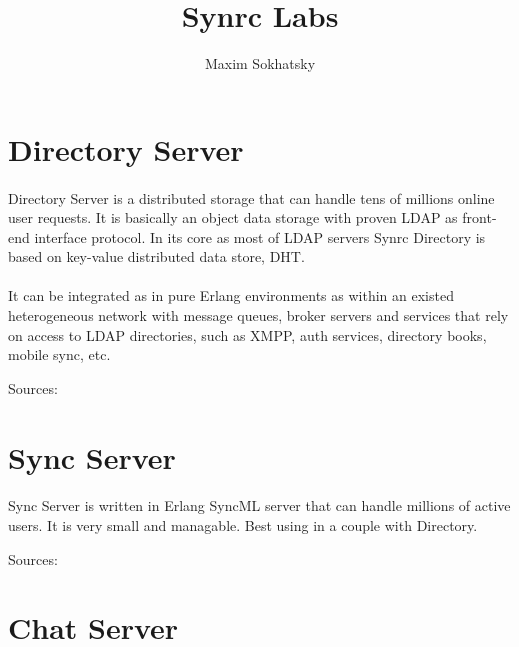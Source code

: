 \documentclass[11pt]{article}
\begin{document}

\title{Synrc Labs}
\author{Maxim Sokhatsky}


\section*{Directory Server}
\paragraph{}
Directory Server is a distributed storage that can handle tens of
millions online user requests. It is basically an object data storage
with proven LDAP as front-end interface protocol.
In its core as most of LDAP servers Synrc Directory is based on
key-value distributed data store, DHT.
\paragraph{}
It can be integrated as in pure Erlang environments as within an
existed heterogeneous network with message queues, broker servers
and services that rely on access to LDAP directories, such as XMPP,
auth services, directory books, mobile sync, etc.

Sources: 


\section*{Sync Server}
\paragraph{}
Sync Server is written in Erlang SyncML server that can handle
millions of active users. It is very small and managable.
Best using in a couple with Directory.

Sources: 

\section*{Chat Server}
\end{document}

